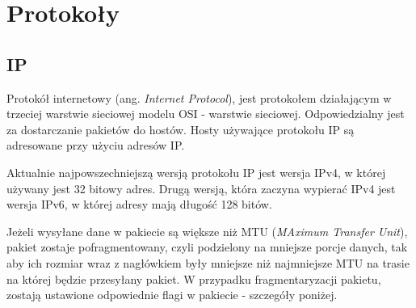\chapter{Protokoły}
	\section{IP}
			Protokół internetowy (ang. \textit{Internet Protocol}), jest protokołem działającym w trzeciej warstwie sieciowej modelu OSI - warstwie sieciowej.
			Odpowiedzialny jest za dostarczanie pakietów do hostów.
			Hosty używające protokołu IP są adresowane przy użyciu adresów IP.

			Aktualnie najpowszechniejszą wersją protokołu IP jest wersja IPv4, w której używany jest 32 bitowy adres.
			Drugą wersją, która zaczyna wypierać IPv4 jest wersja IPv6, w której adresy mają długość 128 bitów.

			Jeżeli wysyłane dane w pakiecie są większe niż MTU (\textit{MAximum Transfer Unit}), pakiet zostaje pofragmentowany, czyli podzielony na mniejsze porcje danych, tak aby ich rozmiar wraz z nagłówkiem były mniejsze niż najmniejsze MTU na trasie na której będzie przesyłany pakiet.
			W przypadku fragmentaryzacji pakietu, zostają ustawione odpowiednie flagi w pakiecie - szczegóły poniżej.
